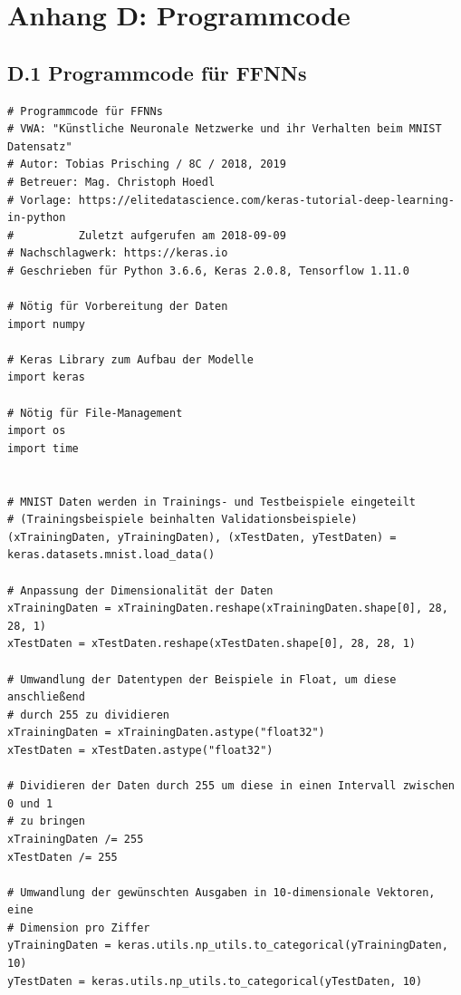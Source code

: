 \documentclass[a4paper,12pt,ngerman,oneside]{scrreprt}	%
\begin{document}
			
		
		\newpage
		\vspace*{2cm}
		\section*{Anhang D: Programmcode}
			
			\subsection*{D.1 Programmcode für FFNNs}
			{\renewcommand*{\ttdefault}{txtt}
				\begin{lstlisting}				
# Programmcode für FFNNs
# VWA: "Künstliche Neuronale Netzwerke und ihr Verhalten beim MNIST Datensatz"
# Autor: Tobias Prisching / 8C / 2018, 2019
# Betreuer: Mag. Christoph Hoedl
# Vorlage: https://elitedatascience.com/keras-tutorial-deep-learning-in-python
#          Zuletzt aufgerufen am 2018-09-09
# Nachschlagwerk: https://keras.io
# Geschrieben für Python 3.6.6, Keras 2.0.8, Tensorflow 1.11.0

# Nötig für Vorbereitung der Daten
import numpy

# Keras Library zum Aufbau der Modelle
import keras

# Nötig für File-Management
import os
import time


# MNIST Daten werden in Trainings- und Testbeispiele eingeteilt
# (Trainingsbeispiele beinhalten Validationsbeispiele)
(xTrainingDaten, yTrainingDaten), (xTestDaten, yTestDaten) = keras.datasets.mnist.load_data()

# Anpassung der Dimensionalität der Daten
xTrainingDaten = xTrainingDaten.reshape(xTrainingDaten.shape[0], 28, 28, 1)
xTestDaten = xTestDaten.reshape(xTestDaten.shape[0], 28, 28, 1)

# Umwandlung der Datentypen der Beispiele in Float, um diese anschließend
# durch 255 zu dividieren
xTrainingDaten = xTrainingDaten.astype("float32")
xTestDaten = xTestDaten.astype("float32")

# Dividieren der Daten durch 255 um diese in einen Intervall zwischen 0 und 1
# zu bringen
xTrainingDaten /= 255
xTestDaten /= 255

# Umwandlung der gewünschten Ausgaben in 10-dimensionale Vektoren, eine
# Dimension pro Ziffer
yTrainingDaten = keras.utils.np_utils.to_categorical(yTrainingDaten, 10)
yTestDaten = keras.utils.np_utils.to_categorical(yTestDaten, 10)



\end{lstlisting}}
\end{document}
